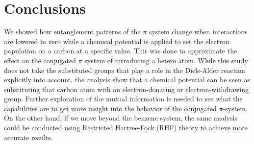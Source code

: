 \documentclass[twoside,twocolumn,9pt]{article}
\renewcommand{\refname}{Notes and references}
\begin{document}
\section{Conclusions}
We showed how entanglement patterns of the $\pi$ system change when interactions are lowered to zero while a chemical potential is applied to set the electron population on a carbon at a specific value. This was done to approximate the effect on the conjugated $\pi$ system of introducing a hetero atom. While this study does not take the substituted groups that play a role in the Diels-Alder reaction explicitly into account, the analysis show that a chemical potential can be seen as substituting that carbon atom with an electron-donating or electron-withdrawing group. Further exploration of the mutual information is needed to see what the capabilities are to get more insight into the behavior of the conjugated $\pi$-system. On the other hand, if we move beyond the benzene system, the same analysis could be conducted using Restricted Hartree-Fock (RHF) theory to achieve more accurate results.
\newline
\newline
\newline
\newline
\newline
\newline
\newline
\newline
\newline
\newline
\newline
\newline
\newline
\newline
\newline
\newline
\newline
\newline
\newline
\newline
\newline
\newline





\end{document}
